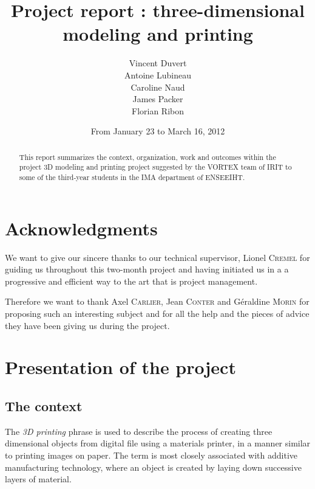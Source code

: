 \documentclass{report}
\title{Project report : three-dimensional modeling and printing}
\author{Vincent Duvert \\ Antoine Lubineau \\ Caroline Naud \\ James Packer \\ Florian Ribon}
\date{From January 23 to March 16, 2012}
\begin{document}
\maketitle

\begin{abstract}
This report summarizes the context, organization, work and outcomes within the project 3D modeling and printing project suggested by the VORTEX team of IRIT to some of the third-year students in the IMA department of ENSEEIHT.
\end{abstract}

\thispagestyle{empty}

\tableofcontents

\newpage

\chapter*{Acknowledgments}

We want to give our sincere thanks to our technical supervisor, Lionel \textsc{Cremel} for guiding us throughout this two-month project and having initiated us in a a progressive and efficient way to the art that is project management.\\

\bigskip

Therefore we want to thank Axel \textsc{Carlier}, Jean \textsc{Conter} and Géraldine \textsc{Morin} for proposing such an interesting subject and for all the help and the pieces of advice they have been giving us during the project.\\

\chapter{Presentation of the project}

\section{The context}

The \textit{3D printing} phrase is used to describe the process of creating three dimensional objects from digital file using a materials printer, in a manner similar to printing images on paper. The term is most closely associated with additive manufacturing technology, where an object is created by laying down successive layers of material.\\
\end{document}
